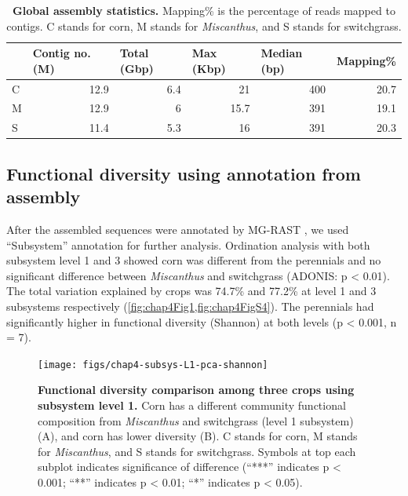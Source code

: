 \documentclass[]{msu-thesis}
\begin{document}
\begin{table}[htbp]
  \centering
  \caption[Global assembly statistics]{\textbf{Global assembly
  statistics.} Mapping\% is the percentage of reads mapped to contigs. C
  stands for corn, M stands for \textit{Miscanthus}, and S stands for
switchgrass.}
    \begin{tabular}{|lrrrrr|}
    \toprule
          & \multicolumn{1}{l}{Contig no. (M)} & \multicolumn{1}{l}{Total (Gbp)} & \multicolumn{1}{l}{Max (Kbp)} & \multicolumn{1}{l}{Median (bp)} & \multicolumn{1}{l|}{Mapping\%} \\
    \midrule
    C     & 12.9  & 6.4   & 21    & 400   & 20.7 \\
    M     & 12.9  & 6     & 15.7  & 391   & 19.1 \\
    S     & 11.4  & 5.3   & 16    & 391   & 20.3 \\
    \bottomrule
    \end{tabular}%
  \label{tab:chap4TabS4}%
\end{table}%


\subsection{Functional diversity using annotation from assembly}
After the assembled sequences were annotated by MG-RAST
\cite{meyer_metagenomics_2008}, we used ``Subsystem'' annotation for
further analysis. Ordination analysis with both subsystem level 1 and 3
showed corn was different from the perennials and no significant
difference between \textit{Miscanthus} and switchgrass (ADONIS: p < 0.01). The
total variation explained by crops was 74.7\% and 77.2\% at level 1 and
3 subsystems respectively (\cref{fig:chap4Fig1,fig:chap4FigS4}). The
perennials had significantly higher in functional diversity (Shannon) at both levels (p < 0.001, n = 7).

\begin{figure}[tbph!]
  \centering
  \texttt{[image: figs/chap4-subsys-L1-pca-shannon]}
  \caption[Functional diversity comparison among three crops using
  subsystem level 1]{\textbf{Functional diversity comparison among three
  crops using subsystem level 1.} Corn has a different community
  functional composition from \textit{Miscanthus} and switchgrass (level
  1 subsystem) (A), and corn has lower diversity (B). C stands for corn,
  M stands for \textit{Miscanthus}, and S stands for switchgrass.
Symbols at top each subplot indicates significance of difference
(``***'' indicates p < 0.001; ``**'' indicates p < 0.01; ``*'' indicates
p < 0.05).}
  \label{fig:chap4FigS4}
\end{figure}
\end{document}
